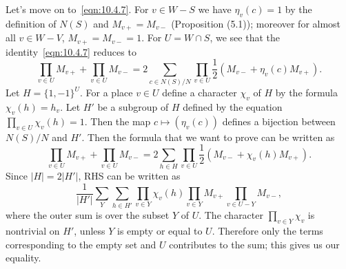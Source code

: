 Let's move on to~\eqref{eqn:10.4.7}.
For $v \in W-S$ we have $\eta_v(c)=1$ by the definition of $N(S)$ and $M_{v+} = M_{v-}$ (Proposition (5.1)); moreover for almost all $v \in W-V$, $M_{v+} = M_{v-} = 1$.
For $U = W \cap S$, we see that the identity~\eqref{eqn:10.4.7} reduces to
\begin{equation*}
    \prod_{v\in U} M_{v+} + \prod_{v\in U}M_{v-} = 2 \sum_{c\in N(S)/N} \prod_{v\in U} \frac{1}{2} (M_{v-} + \eta_v(c)M_{v+}).
\end{equation*}
Let $H = \{1, -1\}^{U}$.
For a place $v \in U$ define a character $\chi_v$ of $H$ by the formula $\chi_v(h) = h_v$.
Let $H'$ be a subgroup of $H$ defined by the equation $\prod_{v\in U}\chi_v(h) = 1$.
Then the map $c \mapsto (\eta_v(c))$ defines a bijection between $N(S)/N$ and $H'$.
Then the formula that we want to prove can be written as
\begin{equation*}
    \prod_{v\in U} M_{v+} + \prod_{v\in U} M_{v-} = 2 \sum_{h\in H} \prod_{v\in U} \frac{1}{2}(M_{v-} + \chi_v(h)M_{v+}).
\end{equation*}
Since $|H| = 2|H'|$, RHS can be written as
\begin{equation*}
    \frac{1}{|H'|} \sum_{Y} \sum_{h\in H'} \prod_{v\in Y} \chi_v(h) \prod_{v \in Y} M_{v+} \prod_{v\in U-Y} M_{v-},
\end{equation*}
where the outer sum is over the subset $Y$ of $U$.
The character $\prod_{v\in Y} \chi_v$ is nontrivial on $H'$, unless $Y$ is empty or equal to $U$.
Therefore only the terms corresponding to the empty set and $U$ contributes to the sum; this gives us our equality.
